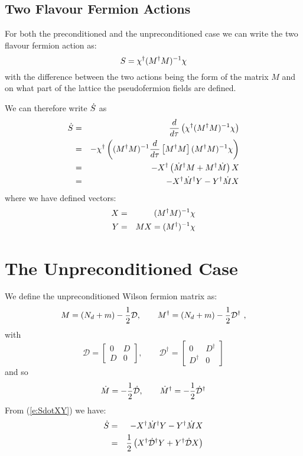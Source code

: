 \documentclass[12pt]{article}
\begin{document}
\subsection{Two Flavour Fermion Actions}
For both the preconditioned and the unpreconditioned case we can write
the two flavour fermion action as:
\begin{equation}
S = \chi^{\dagger} (M^{\dagger} M )^{-1} \chi
\end{equation}
with the difference between the two actions being the form of the 
matrix $M$ and on what part of the lattice the pseudofermion fields
are defined.

We can therefore write $\dot{S}$ as
\begin{eqnarray}
\dot{S} & = & \frac{d}{d \tau} \left( \chi^{\dagger} (M^{\dagger} M)^{-1} \chi \right) \\
      & = & - \chi^{\dagger} \left( (M^{\dagger} M)^{-1} \frac{d}{d \tau} \left[ M^{\dagger} M \right] (M^{\dagger} M)^{-1} \chi \right) \\
      & = & - X^{\dagger} \left( \dot{M}^{\dagger} M + M^{\dagger} \dot{M} \right) X \\
      & = & - X^{\dagger} \dot{M}^{\dagger} Y - Y^{\dagger} \dot{M} X \label{e:SdotXY}
\end{eqnarray}
where we have defined vectors:
\begin{eqnarray}
  X &=& (M^{\dagger} M)^{-1} \chi \\
  Y &=& M X = (M^{\dagger})^{-1} \chi
\end{eqnarray}

\section{The Unpreconditioned Case}
We define the unpreconditioned Wilson fermion matrix as:
\begin{equation}
M = (N_d + m) - \frac{1}{2} \mathcal{D}, \qquad M^{\dagger} = (N_d + m) - \frac{1}{2} \mathcal{D}^{\dagger} \ ,
\end{equation}
with 
\begin{equation}
\mathcal{D} = \left[ \begin{array}{cc} 0 & D \\ D & 0 \end{array} \right], \qquad \mathcal{D}^{\dagger} = \left[ \begin{array}{cc} 0 & D^{\dagger} \\ D^{\dagger} & 0 \end{array} \right]
\end{equation}
and so
\begin{equation}
\dot{M} = -\frac{1}{2} \dot{\mathcal{D}}, \qquad \dot{M}^{\dagger} = -\frac{1}{2} \dot{\mathcal{D}}^{\dagger}
\end{equation}
From (\ref{e:SdotXY}) we have:
\begin{eqnarray} 
\dot{S} &=&  - X^{\dagger} \dot{M}^{\dagger} Y - Y^{\dagger} \dot{M} X \\
      &=& \frac{1}{2} \left( X^{\dagger} \dot{\mathcal{D}}^{\dagger} Y + Y^{\dagger} \dot{\mathcal{D}} X \right) 
\end{eqnarray}
\end{document}
